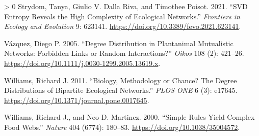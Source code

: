 \documentclass[11pt]{article}
\newlength{\cslhangindent}
\newenvironment{CSLReferences}[3] %
 {%
  \setlength{\parindent}{0pt}
  \ifodd #1 \everypar{\setlength{\hangindent}{\cslhangindent}}\ignorespaces\fi
  \ifnum #2 > 0
  \setlength{\parskip}{#2\baselineskip}
  \fi
 }%
 {}
\begin{document}
\begin{CSLReferences}{1}{0}
\leavevmode\hypertarget{ref-Strydom2021SvdEnt}{}%
Strydom, Tanya, Giulio V. Dalla Riva, and Timothee Poisot. 2021. {``SVD
Entropy Reveals the High Complexity of Ecological Networks.''}
\emph{Frontiers in Ecology and Evolution} 9: 623141.
\url{https://doi.org/10.3389/fevo.2021.623141}.

\leavevmode\hypertarget{ref-Vazquez2005DegDisa}{}%
Vázquez, Diego P. 2005. {``Degree Distribution in Plantanimal
Mutualistic Networks: Forbidden Links or Random Interactions?''}
\emph{Oikos} 108 (2): 421--26.
\url{https://doi.org/10.1111/j.0030-1299.2005.13619.x}.

\leavevmode\hypertarget{ref-Williams2011BioMet}{}%
Williams, Richard J. 2011. {``Biology, Methodology or Chance? The Degree
Distributions of Bipartite Ecological Networks.''} \emph{PLOS ONE} 6
(3): e17645. \url{https://doi.org/10.1371/journal.pone.0017645}.

\leavevmode\hypertarget{ref-Williams2000SimRul}{}%
Williams, Richard J., and Neo D. Martinez. 2000. {``Simple Rules Yield
Complex Food Webs.''} \emph{Nature} 404 (6774): 180--83.
\url{https://doi.org/10.1038/35004572}.

\end{CSLReferences}
\end{document}
